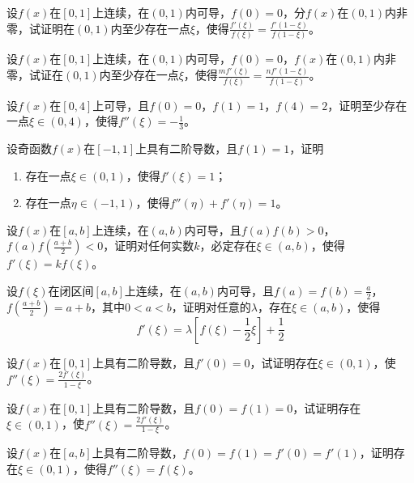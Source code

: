 \begin{example}
	设$f(x)$在$[0,1]$上连续，在$(0,1)$内可导，$f(0)=0$，$分f(x)$在$(0,1)$内非零，试证明在$(0,1)$内至少存在一点$\xi$，使得$\frac{f'(\xi)}{f(\xi)}=\frac{f'(1-\xi)}{f(1-\xi)}$。
\end{example}
\begin{example}
	设$f(x)$在$[0,1]$上连续，在$(0,1)$内可导，$f(0)=0$，$f(x)$在$(0,1)$内非零，试证在$(0,1)$内至少存在一点$\xi$，使得$\frac{mf'(\xi)}{f(\xi)}=\frac{nf'(1-\xi)}{f(1-\xi)}$。
\end{example}

\begin{example}
	设$f(x)$在$[0,4]$上可导，且$f(0)=0$，$f(1)=1$，$f(4)=2$，证明至少存在一点$\xi\in(0,4)$，使得$f''(\xi)=-\frac{1}{3}$。
\end{example}

\begin{example}
	设奇函数$f(x)$在$[-1,1]$上具有二阶导数，且$f(1)=1$，证明
	\begin{enumerate}
		\item 存在一点$\xi\in(0,1)$，使得$f'(\xi)=1$；
		\item 存在一点$\eta\in(-1,1)$，使得$f''(\eta)+f'(\eta)=1$。
	\end{enumerate}
\end{example}

\begin{example}
	设$f(x)$在$[a,b]$上连续，在$(a,b)$内可导，且$f(a)f(b)>0$，$f(a)f(\frac{a+b}{2})<0$，证明对任何实数$k$，必定存在$\xi\in(a,b)$，使得$f'(\xi)=kf(\xi)$。
\end{example}

\begin{example}
	设$f(\xi)$在闭区间$[a,b]$上连续，在$(a,b)$内可导，且$f(a)=f(b)=\frac{a}{2}$，$f(\frac{a+b}{2})=a+b$，其中$0<a<b$，证明对任意的$\lambda$，存在$\xi\in(a,b)$，使得\[f'(\xi)=\lambda\left[f(\xi)-\frac{1}{2}\xi\right]+\frac{1}{2}\]
\end{example}

\begin{example}
	设$f(x)$在$[0,1]$上具有二阶导数，且$f'(0)=0$，试证明存在$\xi\in(0,1)$，使$f''(\xi)=\frac{2f'(\xi)}{1-\xi}$。
\end{example}

\begin{example}
	设$f(x)$在$[0,1]$上具有二阶导数，且$f(0)=f(1)=0$，试证明存在$\xi\in(0,1)$，使$f''(\xi)=\frac{2f'(\xi)}{1-\xi}$。
\end{example}

\begin{example}
	设$f(x)$在$[a,b]$上具有二阶导数，$f(0)=f(1)=f'(0)=f'(1)$，证明存在$\xi\in(0,1)$，使得$f''(\xi)=f(\xi)$。
\end{example}

